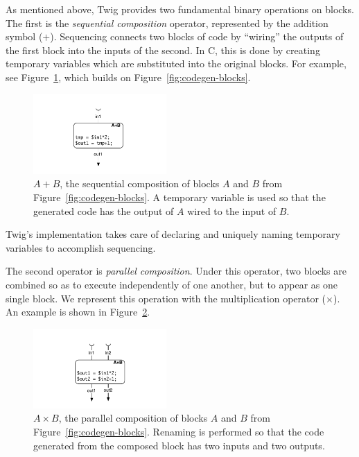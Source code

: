 As mentioned above, Twig provides two fundamental binary operations on blocks. The first is the \emph{sequential composition} operator, represented by the addition symbol ($+$). Sequencing connects two blocks of code by ``wiring'' the outputs of the first block into the inputs of the second. In C, this is done by creating temporary variables which are substituted into the original blocks. For example, see Figure~\ref{fig:codegen-seq}, which builds on Figure~\ref{fig:codegen-blocks}.

\begin{figure}[ht]
\centering
\includegraphics[width=2in]{images/code-gen-seq}
\caption{$A+B$, the sequential composition of blocks $A$ and $B$ from Figure~\ref{fig:codegen-blocks}. A temporary variable is used so that the generated code has the output of $A$ wired to the input of $B$.}
\label{fig:codegen-seq}
\end{figure}

Twig's implementation takes care of declaring and uniquely naming temporary variables to accomplish sequencing.

The second operator is \emph{parallel composition}. Under this operator, two blocks are combined so as to execute independently of one another, but to appear as one single block. We represent this operation with the multiplication operator ($\times$). An example is shown in Figure~\ref{fig:codegen-par}.

\begin{figure}[ht]
\centering
\includegraphics[width=2in]{images/code-gen-par}
\caption{$A \times B$, the parallel composition of blocks $A$ and $B$ from Figure~\ref{fig:codegen-blocks}. Renaming is performed so that the code generated from the composed block has two inputs and two outputs.}
\label{fig:codegen-par}
\end{figure}

